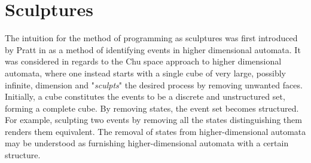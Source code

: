 \section{Sculptures}
\label{sec:sculptures}
    The intuition for the method of programming as sculptures was first introduced by Pratt in \cite{Pratt00Sculptures} as a method of identifying events in higher dimensional automata. It was considered in regards to the Chu space approach to higher dimensional automata, where one instead starts with a single cube of very large, possibly infinite, dimension and "\emph{sculpts}" the desired process by removing unwanted faces. Initially, a cube constitutes the events to be a discrete and unstructured set, forming a complete cube. By removing states, the event set becomes structured. For example, sculpting two events by removing all the states distinguishing them renders them equivalent. The removal of states from higher-dimensional automata may be understood as furnishing higher-dimensional automata with a certain structure.
    
    
    
